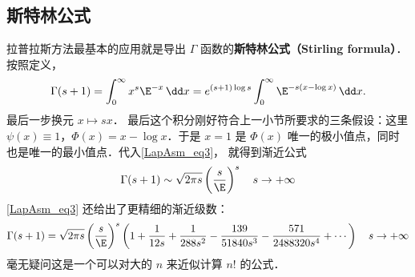\subsection{斯特林公式}
拉普拉斯方法最基本的应用就是导出 $\Gamma$ 函数的\textbf{斯特林公式（Stirling formula）}． 按照定义，
\[
  \Gamma(s+1)
  =\int_0^\infty x^s\E^{-x}\,\dd x
  =e^{(s+1)\log s}\int_0^\infty \E^{-s(x-\log x)}\,\dd x.
\]
最后一步换元 $x\mapsto sx$． 最后这个积分刚好符合上一小节所要求的三条假设：这里 $\psi(x)\equiv1$，$\Phi(x)=x-\log x$．于是 $x=1$ 是 $\Phi(x)$ 唯一的极小值点，同时也是唯一的最小值点．代入\autoref{LapAsm_eq3}， 就得到渐近公式
\[
  \Gamma(s+1)\sim\sqrt{2\pi s}\left(\frac{s}{\E}\right)^s\quad s\to+\infty
\]
\autoref{LapAsm_eq3} 还给出了更精细的渐近级数：
\[
  \Gamma(s+1)
  =\sqrt{2\pi s}\left({s\over \E}\right)^s
  \left(
   1
   +{1\over12s}
   +{1\over288 s^2}
   -{139\over51840 s^3}
   -{571\over2488320 s^4}
   + \cdots
  \right)\quad s\to+\infty
\]
毫无疑问这是一个可以对大的 $n$ 来近似计算 $n!$ 的公式．
